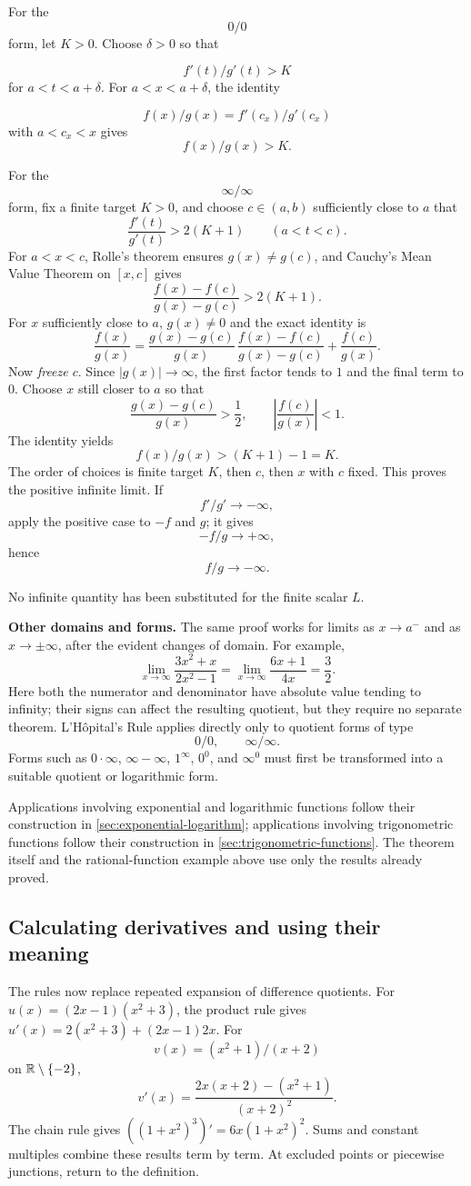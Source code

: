 For the
\[
0/0
\]
 form, let $K>0$. Choose $\delta>0$ so that

\[
f'(t)/g'(t)>K
\]
 for $a<t<a+\delta$. For $a<x<a+\delta$, the identity

\[
f(x)/g(x)=f'(c_x)/g'(c_x)
\]
 with $a<c_x<x$ gives
\[
f(x)/g(x)>K.
\]


For the
\[
\infty/\infty
\]
 form, fix a finite target $K>0$, and choose
$c\in(a,b)$ sufficiently close to $a$ that
\[
\frac{f'(t)}{g'(t)}>2(K+1)\qquad(a<t<c).
\]
For $a<x<c$, Rolle's theorem ensures $g(x)\ne g(c)$, and Cauchy's
Mean Value Theorem on $[x,c]$ gives
\[
\frac{f(x)-f(c)}{g(x)-g(c)}>2(K+1).
\]
For $x$ sufficiently close to $a$, $g(x)\ne0$ and the exact identity is
\[
\frac{f(x)}{g(x)}
=\frac{g(x)-g(c)}{g(x)}\,
  \frac{f(x)-f(c)}{g(x)-g(c)}+\frac{f(c)}{g(x)}.
\]
Now \emph{freeze $c$}. Since $|g(x)|\to\infty$, the first factor tends
to $1$ and the final term to $0$. Choose $x$ still closer to $a$ so that
\[
\frac{g(x)-g(c)}{g(x)}>\frac12,
\qquad \left|\frac{f(c)}{g(x)}\right|<1.
\]
The identity yields
\[
f(x)/g(x)>(K+1)-1=K.
\]
 The order of choices is
finite target $K$, then $c$, then $x$ with $c$ fixed. This proves the
positive infinite limit. If
\[
f'/g'\to-\infty,
\]
 apply the positive case
to $-f$ and $g$; it gives
\[
-f/g\to+\infty,
\]
 hence
\[
f/g\to-\infty.
\]

No infinite quantity has been substituted for the finite scalar $L$.

\noindent\textbf{Other domains and forms.} The same proof works for limits
as $x\to a^-$ and as $x\to\pm\infty$, after the evident changes of domain.
For example,
\[
\lim_{x\to\infty}\frac{3x^2+x}{2x^2-1}
=\lim_{x\to\infty}\frac{6x+1}{4x}
=\frac32.
\]
Here both the numerator and denominator have absolute value tending to
infinity; their signs can affect the resulting quotient, but they require no
separate theorem. L'H\^opital's Rule applies directly only to quotient forms
of type
\[
0/0,\qquad \infty/\infty.
\]
 Forms such as $0\cdot\infty$,
$\infty-\infty$, $1^\infty$, $0^0$, and $\infty^0$ must first be transformed
into a suitable quotient or logarithmic form.

Applications involving exponential and logarithmic functions follow their
construction in \cref{sec:exponential-logarithm}; applications involving
trigonometric functions follow their construction in
\cref{sec:trigonometric-functions}. The theorem itself and
the rational-function example above use only the results already proved.

\subsection*{Calculating derivatives and using their meaning}
The rules now replace repeated expansion of difference quotients.
For $u(x)=(2x-1)(x^2+3)$, the product rule gives
$u'(x)=2(x^2+3)+(2x-1)2x$.
For
\[
v(x)=(x^2+1)/(x+2)
\]
 on $\mathbb{R}\setminus\{-2\}$,
\[
v'(x)=\frac{2x(x+2)-(x^2+1)}{(x+2)^2}.
\]
The chain rule gives $((1+x^2)^3)'=6x(1+x^2)^2$.
Sums and constant multiples combine these results term by term.
At excluded points or piecewise junctions, return to the definition.


